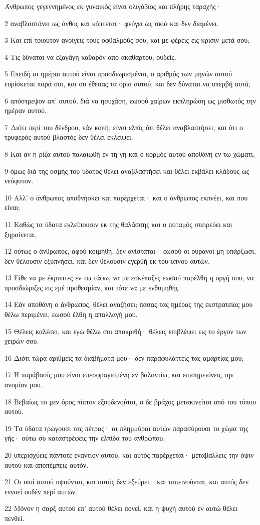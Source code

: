 \par Άνθρωπος γεγεννημένος εκ γυναικός είναι ολιγόβιος και πλήρης ταραχής·
\par 2 αναβλαστάνει ως άνθος και κόπτεται· φεύγει ως σκιά και δεν διαμένει.
\par 3 Και επί τοιούτον ανοίγεις τους οφθαλμούς σου, και με φέρεις εις κρίσιν μετά σου;
\par 4 Τις δύναται να εξαγάγη καθαρόν από ακαθάρτου; ουδείς.
\par 5 Επειδή αι ημέραι αυτού είναι προσδιωρισμέναι, ο αριθμός των μηνών αυτού ευρίσκεται παρά σοι, και συ έθεσας τα όρια αυτού, και δεν δύναται να υπερβή αυτά,
\par 6 απόστρεψον απ' αυτού, διά να ησυχάση, εωσού χαίρων εκπληρώση ως μισθωτός την ημέραν αυτού.
\par 7 Διότι περί του δένδρου, εάν κοπή, είναι ελπίς ότι θέλει αναβλαστήσει, και ότι ο τρυφερός αυτού βλαστός δεν θέλει εκλείψει.
\par 8 Και αν η ρίζα αυτού παλαιωθή εν τη γη και ο κορμός αυτού αποθάνη εν τω χώματι,
\par 9 όμως διά της οσμής του ύδατος θέλει αναβλαστήσει και θέλει εκβάλει κλάδους ως νεόφυτον.
\par 10 Αλλ' ο άνθρωπος αποθνήσκει και παρέρχεται· και ο άνθρωπος εκπνέει, και που είναι;
\par 11 Καθώς τα ύδατα εκλείπουσιν εκ της θαλάσσης και ο ποταμός στειρεύει και ξηραίνεται,
\par 12 ούτως ο άνθρωπος, αφού κοιμηθή, δεν ανίσταται· εωσού οι ουρανοί μη υπάρξωσι, δεν θέλουσιν εξυπνήσει, και δεν θέλουσιν εγερθή εκ του ύπνου αυτών.
\par 13 Είθε να με έκρυπτες εν τω τάφω, να με εσκέπαζες εωσού παρέλθη η οργή σου, να προσδιώριζες εις εμέ προθεσμίαν, και τότε να με ενθυμηθής
\par 14 Εάν αποθάνη ο άνθρωπος, θέλει αναζήσει; πάσας τας ημέρας της εκστρατείας μου θέλω περιμένει, εωσού έλθη η απαλλαγή μου.
\par 15 Θέλεις καλέσει, και εγώ θέλω σοι αποκριθή· θέλεις επιβλέψει εις το έργον των χειρών σου.
\par 16 Διότι τώρα αριθμείς τα διαβήματά μου· δεν παραφυλάττεις τας αμαρτίας μου;
\par 17 Η παράβασίς μου είναι επεσφραγισμένη εν βαλαντίω, και επισημειόνεις την ανομίαν μου.
\par 18 Βεβαίως το μεν όρος πίπτον εξουδενούται, ο δε βράχος μετακινείται από του τόπου αυτού.
\par 19 Τα ύδατα τρώγουσι τας πέτρας· αι πλημμύραι αυτών παρασύρουσι το χώμα της γής· ούτω συ καταστρέφεις την ελπίδα του ανθρώπου,
\par 20 υπερισχύεις πάντοτε εναντίον αυτού, και αυτός παρέρχεται· μεταβάλλεις την όψιν αυτού και αποπέμπεις αυτόν.
\par 21 Οι υιοί αυτού υψούνται, και αυτός δεν εξεύρει· και ταπεινούνται, και αυτός δεν εννοεί ουδέν περί αυτών.
\par 22 Μόνον η σαρξ αυτού επ' αυτού θέλει πονεί, και η ψυχή αυτού εν αυτώ θέλει πενθεί.

